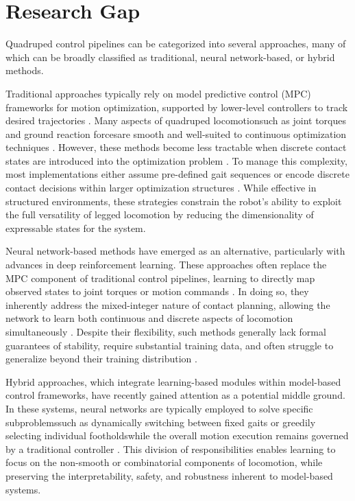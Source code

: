 \section{Research Gap}
\label{sec:introduction-research-gap}

Quadruped control pipelines can be categorized into several
approaches, many of which can be broadly classified as traditional,
neural network-based, or hybrid methods.

Traditional approaches typically rely on model predictive control
(MPC) frameworks for motion optimization, supported by lower-level
controllers to track desired trajectories
\cite{Kim2019highly-dynamic}. Many aspects of quadruped
locomotion\textemdash such as joint torques and ground reaction
forces\textemdash are smooth and well-suited to continuous
optimization techniques
\cite{Wensing2022Nov}. However, these methods become less tractable
when discrete contact states are introduced into the optimization
problem \cite{Geisert2019contact-planning}. To manage this
complexity, most implementations either assume pre-defined gait
sequences \cite{Chai2022survey, Fan2024survey} or encode discrete
contact decisions within larger optimization structures
\cite{winkler_gait_2018}. While effective in structured environments,
these strategies constrain the robot's ability to exploit the full
versatility of legged locomotion by reducing the dimensionality of
expressable states for the system.

Neural network-based methods have emerged as an alternative,
particularly with advances in deep reinforcement learning. These
approaches often replace the MPC component of traditional control
pipelines, learning to directly map observed states to joint torques
or motion commands \cite{Gurram2024survey}. In doing so, they
inherently address the mixed-integer nature of contact planning,
allowing the network to learn both continuous and discrete aspects of
locomotion simultaneously \cite{Wensing2022Nov}. Despite their
flexibility, such methods generally lack formal guarantees of
stability, require substantial training data, and often struggle to
generalize beyond their training distribution \cite{Gurram2024survey}.

Hybrid approaches, which integrate learning-based modules within
model-based control frameworks, have recently gained attention as a
potential middle ground. In these systems, neural networks are
typically employed to solve specific subproblems\textemdash such as
dynamically switching between fixed gaits or greedily selecting
individual footholds\textemdash while the overall motion execution
remains governed by a traditional controller \cite{Bao2024survey,
Wang2022Oct}. This division of responsibilities enables learning to
focus on the non-smooth or combinatorial components of locomotion,
while preserving the interpretability, safety, and robustness
inherent to model-based systems.

